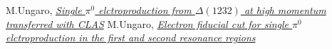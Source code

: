\begin{thebibliography}{mybib}
                           {M.Ungaro},  \href{https://maureeungaro.github.io/home/meson/pi0_delta/pi0_delta}       {\it Single $\pi^0$ elctroproduction from $\Delta(1232)$ at high momentum transferred with CLAS}
     {M.Ungaro},  \href{https://maureeungaro.github.io/home/meson/pi0_resonance/electron_fid}{\it Electron fiducial cut for single $\pi^0$ elctroproduction in the first and second resonance regions}
\end{thebibliography}
